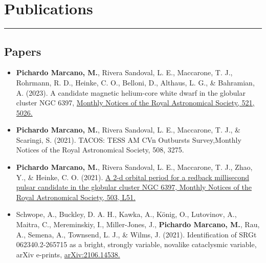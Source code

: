 \documentclass[letterpaper,10pt]{article}
\begin{document}
\section*{Publications }%
\hrule
\vspace{.3 cm}
\subsection*{Papers}
\begin{itemize}[label=$\blacktriangleright$]

\subsubsection*{Refereed}

                \item \textbf{Pichardo Marcano, M.}, Rivera Sandoval, L. E., Maccarone, T. J., Rohrmann, R. D., Heinke, C. O., Belloni, D., Althaus, L. G., \& Bahramian, A. (2023). A candidate magnetic helium-core white dwarf in the globular cluster NGC 6397, \href{https://ui.adsabs.harvard.edu/abs/2023MNRAS.521.5026P/abstract}{Monthly Notices of the Royal Astronomical Society, 521, 5026.}





        
        \item \textbf{Pichardo Marcano, M.}, Rivera Sandoval, L. E., Maccarone, T. J., \& Scaringi, S. (2021). TACOS: TESS AM CVn Outbursts Survey,Monthly Notices of the Royal Astronomical Society, 508, 3275.


        
                
            \item \textbf{Pichardo Marcano, M.}, Rivera Sandoval, L. E., Maccarone, T. J., Zhao, Y., \& Heinke, C. O. (2021). \href{https://ui.adsabs.harvard.edu/abs/2021MNRAS.503L..51P/abstract}{A 2-d orbital period for a redback millisecond pulsar candidate in the globular cluster NGC 6397, Monthly Notices of the Royal Astronomical Society, 503, L51.}
        
        
        \item Schwope, A., Buckley, D. A. H., Kawka, A., K\"onig, O., Lutovinov, A., Maitra, C., Mereminskiy, I., Miller-Jones, J., \textbf{Pichardo Marcano, M.}, Rau, A., Semena, A., Townsend, L. J., \& Wilms, J. (2021). Identification of SRGt 062340.2-265715 as a bright, strongly variable, novalike cataclysmic variable, arXiv e-prints, \href{https://ui.adsabs.harvard.edu/abs/2021arXiv210614538S/abstract}{arXiv:2106.14538.}






\end{itemize}
\end{document}
